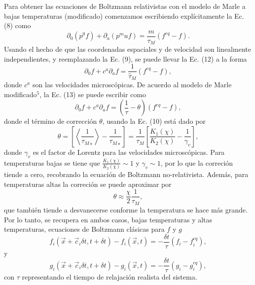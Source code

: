 \documentclass{article}
\begin{document}
Para obtener las ecuaciones de Boltzmann relativistas con el modelo de Marle a bajas temperaturas (modificado) comenzamos escribiendo explícitamente la Ec. (8) como
\begin{equation}
    \partial_0 (p^0 f) + \partial_a ( p^mu f) = \frac{m}{\tau_M} (f^{eq} -f).
\end{equation}
Usando el hecho de que las coordenadas espaciales y de velocidad son linealmente independientes, y reemplazando la Ec. (9), se puede llevar la Ec. (12) a la forma
\begin{equation}
    \partial_0 f + c^a \partial_a f = \frac{1}{\hat{\tau}_M} (f^{eq} -f),    
\end{equation}
donde $c^a$ son las velocidades microscópicas. De acuerdo al modelo de Marle modificado$^5$, la Ec. (13) se puede escribir como
\begin{equation}
    \partial_0 f + c^a \partial_a f = \left( \frac{1}{\tau}-\theta \right)  (f^{eq} -f),
\end{equation}
 donde el término de corrección $\theta$, usando la Ec. (10) está dado por
 \begin{equation}
     \theta = \left[ \left\langle \frac{1}{\tau_{M\star}} \right\rangle - \frac{1}{\tau_{M\star}} \right] = \frac{1}{\tau_M}\left[ \frac{K_1(\chi)}{K_2(\chi)}-\frac{1}{\gamma_v} \right],
 \end{equation}
donde $\gamma_v$ es el factor de Lorentz para las velocidades microscópicas. Para temperaturas bajas se tiene que $\frac{K_1(\chi)}{K_2(\chi)} \sim 1$ y $\gamma_v \sim 1$, por lo que la correción tiende a cero, recobrando la ecuación de Boltzmann no-relativista. Además, para temperaturas altas la correción se puede aproximar por
\begin{equation}
    \theta \approx \frac{\chi}{2} \frac{1}{\tau_M},
\end{equation}
que también tiende a desvanecerse conforme la temperatura se hace más grande. Por lo tanto, se recupera en ambos casos, bajas temperaturas y altas temperaturas, ecuaciones de Boltzmann clásicas para $f$ y $g$
\begin{equation}
    f_i(\vec{x} + \vec{c}_i\delta t, t + \delta t) -f_i (\vec{x}, t) = - \frac{\delta t}{\tau} (f_i - f_i^{eq}),
\end{equation}
y
\begin{equation}
    g_i(\vec{x} + \vec{c}_i\delta t, t + \delta t) -g_i (\vec{x}, t) = - \frac{\delta t}{\tau} (g_i - g_i^{eq}),
\end{equation}
con $\tau$ representando el tiempo de relajación realista del sistema.\\
    
\end{document}
